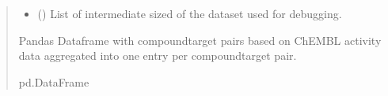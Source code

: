 \documentclass[letterpaper,10pt,english]{sphinxmanual}
\begin{document}
\begin{fulllineitems}
\begin{quote}
\begin{description}
\begin{itemize}
\item {} 
\sphinxAtStartPar
{} (\sphinxstyleliteralemphasis{\sphinxupquote{{[}}}\sphinxstyleliteralemphasis{\sphinxupquote{{[}}}\sphinxstyleliteralemphasis{\sphinxupquote{{]}}}\sphinxstyleliteralemphasis{\sphinxupquote{, }}\sphinxstyleliteralemphasis{\sphinxupquote{{[}}}\sphinxstyleliteralemphasis{\sphinxupquote{{]}}}\sphinxstyleliteralemphasis{\sphinxupquote{{]}}}) \textendash{} List of intermediate sized of the dataset used for debugging.

\end{itemize}

\sphinxAtStartPar
Pandas Dataframe with compound\sphinxhyphen{}target pairs based on ChEMBL activity data
aggregated into one entry per compound\sphinxhyphen{}target pair.

\sphinxAtStartPar
pd.DataFrame

\end{description}\end{quote}

\end{fulllineitems}

\end{document}
